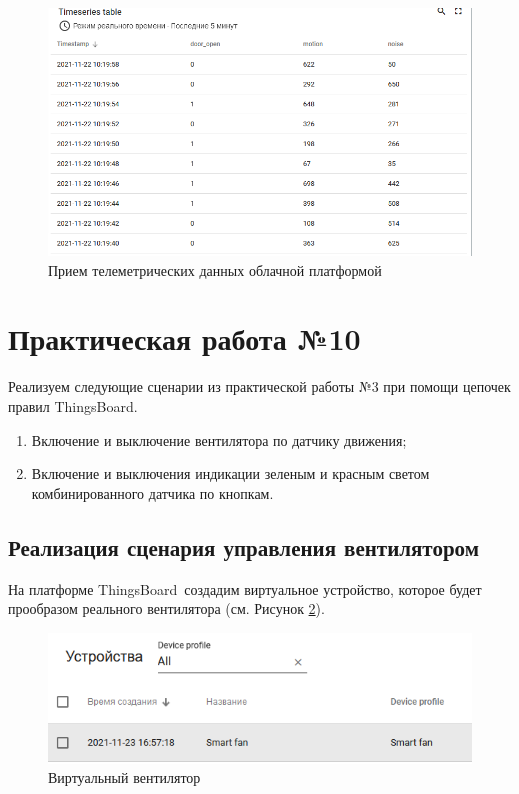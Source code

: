 \documentclass[a4paper,14pt]{extarticle}
\newcommand{\tb}{ThingsBoard~}
\begin{document}
\begin{figure}[h!]
	\centering
	\includegraphics[width=0.6\linewidth]{images/dop9-recieve}
	\caption{Прием телеметрических данных облачной платформой}
	\label{fig:dop9-recieve}
\end{figure}

\section{Практическая работа №10}

Реализуем следующие сценарии из практической работы №3 при помощи цепочек правил ThingsBoard.

\begin{enumerate}
	\item Включение и выключение вентилятора по датчику движения;
	\item Включение и выключения индикации зеленым и красным светом комбинированного датчика по кнопкам.
\end{enumerate}

\subsection{Реализация сценария управления вентилятором}
На платформе \tb создадим виртуальное устройство, которое будет прообразом реального вентилятора (см. Рисунок \ref{fig:dev}).

\begin{figure}[h!]
	\centering
	\includegraphics[width=0.6\linewidth]{images/dev}
	\caption{Виртуальный вентилятор}
	\label{fig:dev}
\end{figure}
\end{document}
